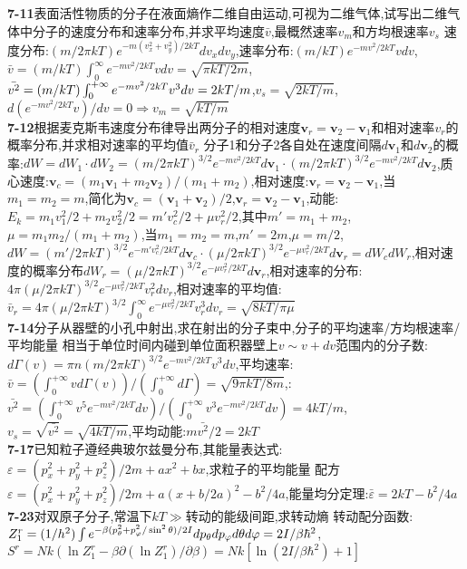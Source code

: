 \documentclass[10pt,a4paper]{article}
\begin{document}
\begin{multicols}{2}
\textbf{7-11}表面活性物质的分子在液面熵作二维自由运动,可视为二维气体,试写出二维气体中分子的速度分布和速率分布,并求平均速度$\bar{v}$,最概然速率$v_m$和方均根速率$v_s$\quad\quad
速度分布:$(m/2\pi kT)e^{-m(v_x^2+v_y^2)/2kT}dv_xdv_y$,速率分布:$(m/kT)e^{-mv^2/2kT}vdv$,$\bar{v}=(m/kT)\int_0^{\infty}e^{-mv^2/2kT}vdv=\sqrt{\pi kT/2m}$,$\bar{v^2}=(m/kT)\\\int_0^{+\infty}e^{-mv^2/2kT}v^3dv=2kT/m$,$v_s=\sqrt{2kT/m}$,$d(e^{-mv^2/2kT}v)/dv=0\Rightarrow v_m=\sqrt{kT/m}$\\
\textbf{7-12}根据麦克斯韦速度分布律导出两分子的相对速度$\bm{v}_r=\bm{v}_2-\bm{v}_1$和相对速率$v_r$的概率分布,并求相对速率的平均值$\bar{v}_r$\quad\quad
分子1和分子2各自处在速度间隔$d\bm{v}_1$和$d\bm{v}_2$的概率:$dW=dW_1\cdot dW_2=(m/2\pi kT)^{3/2}e^{-mv^2/2kT}d\bm{v}_1\cdot(m/2\pi kT)^{3/2}e^{-mv^2/2kT}d\bm{v}_2$,质心速度:$\bm{v}_c=(m_1\bm{v}_1+m_2\bm{v}_2)/(m_1+m_2)$,相对速度:$\bm{v}_r=\bm{v}_2-\bm{v}_1$,当$m_1=m_2=m$,简化为$\bm{v}_c=(\bm{v}_1+\bm{v}_2)/2$,$\bm{v}_r=\bm{v}_2-\bm{v}_1$,动能:$E_k=m_1v_1^2/2+m_2v_2^2/2=m'v_c^2/2+\mu v_r^2/2$,其中$m'=m_1+m_2$,$\mu=m_1m_2/(m_1+m_2)$,当$m_1=m_2=m$,$m'=2m$,$\mu=m/2$,$dW=(m'/2\pi kT)^{3/2}e^{-m'v_c^2/2kT}d\bm{v}_c\cdot(\mu/2\pi kT)^{3/2}e^{-\mu v_r^2/2kT}d\bm{v}_r=dW_cdW_r$,相对速度的概率分布$dW_r=(\mu/2\pi kT)^{3/2}e^{-\mu v_r^2/2kT}d\bm{v}_r$,相对速率的分布:$4\pi(\mu/2\pi kT)^{3/2}e^{-\mu v_r^2/2kT}v_r^2dv_r$,相对速率的平均值:$\bar{v}_r=4\pi(\mu/2\pi kT)^{3/2}\int_0^{\infty}e^{-\mu v_r^2/2kT}v_r^3dv_r=\sqrt{8kT/\pi\mu}$\\
\textbf{7-14}分子从器壁的小孔中射出,求在射出的分子束中,分子的平均速率/方均根速率/平均能量\quad\quad
相当于单位时间内碰到单位面积器壁上$v\sim v+dv$范围内的分子数:$d\Gamma(v)=\pi n(m/2\pi kT)^{3/2}e^{-mv^2/2kT}v^3dv$,平均速率:$\bar{v}=(\int_0^{+\infty}vd\Gamma(v))/(\int_0^{+\infty}d\Gamma)=\sqrt{9\pi kT/8m}$,:$\bar{v^2}=(\int_0^{+\infty}v^5e^{-mv^2/2kT}dv)/(\int_0^{+\infty}v^3e^{-mv^2/2kT}dv)=4kT/m$,$v_s=\sqrt{\bar{v^2}}=\sqrt{4kT/m}$,平均动能:$m\bar{v^2}/2=2kT$\\
\textbf{7-17}已知粒子遵经典玻尔兹曼分布,其能量表达式:$\varepsilon=(p_x^2+p_y^2+p_z^2)/2m+ax^2+bx$,求粒子的平均能量\quad\quad
配方$\varepsilon=(p_x^2+p_y^2+p_z^2)/2m+a(x+b/2a)^2-b^2/4a$,能量均分定理:$\bar{\varepsilon}=2kT-b^2/4a$\\
\textbf{7-23}对双原子分子,常温下$kT\gg$转动的能级间距,求转动熵\quad
转动配分函数:$Z_1^r=(1/h^2)\int e^{-\beta(p_{\theta}^2+p_{\varphi}^2/\sin^2\theta)/2I}\\dp_{\theta}dp_{\varphi}d\theta d\varphi=2I/\beta\hbar^2$,$S^r=Nk(\ln Z_1^r-\beta\partial(\ln Z_1^r)/\partial\beta)=Nk[\ln(2I/\beta\hbar^2)+1]$\\

\end{multicols}
\end{document}
